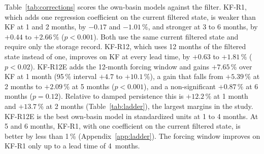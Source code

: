 \documentclass[hess, manuscript]{copernicus}
\begin{document}
Table~\ref{tab:corrections} scores the own-basin models against the
filter. KF-R1, which adds one regression coefficient on the current
filtered state, is weaker than KF at 1 and 2 months, by
$-0.17$ and $-1.01\,\%$, and stronger at 3 to 6 months, by
$+0.44$ to $+2.66\,\%$ ($p < 0.001$). Both use the same current filtered
state and require only the storage record.
KF-R12, which uses 12 months of the filtered state instead
of one, improves on KF at every lead time, by
$+0.63$ to $+1.81\,\%$ ($p < 0.02$). KF-R12E adds the 12-month forcing
window and gains
$+7.65\,\%$ over KF at 1 month (95\,\% interval $+4.7$ to $+10.1\,\%$),
a gain that falls from $+5.39\,\%$ at 2 months to $+2.09\,\%$ at 5
months ($p < 0.001$), and a
non-significant $+0.87\,\%$ at 6 months ($p = 0.12$). Relative to damped
persistence this is
$+12.2\,\%$ at 1 month and $+13.7\,\%$ at 2 months (Table~\ref{tab:ladder}),
the largest margins in the study. KF-R12E is the best own-basin model in
standardized units at 1 to 4 months. At 5 and 6 months, KF-R1, with one
coefficient on the current filtered state, is better by less than 1\,\%
(Appendix~\ref{app:ladder}). The forcing window improves on KF-R1 only up
to a lead time of 4~months.
\end{document}
